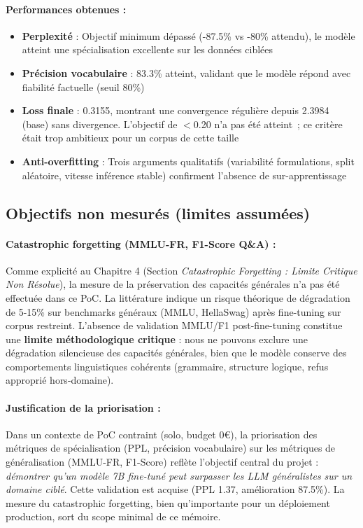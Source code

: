 \paragraph{Performances obtenues :}
\begin{itemize}
    \item \textbf{Perplexité} : Objectif minimum dépassé (-87.5\% vs -80\% attendu), le modèle atteint une spécialisation excellente sur les données ciblées
    \item \textbf{Précision vocabulaire} : 83.3\% atteint, validant que le modèle répond avec fiabilité factuelle (seuil 80\%)
    \item \textbf{Loss finale} : 0.3155, montrant une convergence régulière depuis 2.3984 (base) sans divergence. L'objectif de $<$0.20 n'a pas été atteint~; ce critère était trop ambitieux pour un corpus de cette taille
    \item \textbf{Anti-overfitting} : Trois arguments qualitatifs (variabilité formulations, split aléatoire, vitesse inférence stable) confirment l'absence de sur-apprentissage
\end{itemize}

\subsection{Objectifs non mesurés (limites assumées)}

\paragraph{Catastrophic forgetting (MMLU-FR, F1-Score Q\&A) :}
Comme explicité au Chapitre 4 (Section \textit{Catastrophic Forgetting : Limite Critique Non Résolue}), la mesure de la préservation des capacités générales n'a pas été effectuée dans ce PoC. La littérature \citep{kirkpatrick2017overcoming, french1999catastrophic} indique un risque théorique de dégradation de 5-15\% sur benchmarks généraux (MMLU, HellaSwag) après fine-tuning sur corpus restreint. L'absence de validation MMLU/F1 post-fine-tuning constitue une \textbf{limite méthodologique critique} : nous ne pouvons exclure une dégradation silencieuse des capacités générales, bien que le modèle conserve des comportements linguistiques cohérents (grammaire, structure logique, refus approprié hors-domaine).

\paragraph{Justification de la priorisation :}
Dans un contexte de PoC contraint (solo, budget 0€), la priorisation des métriques de spécialisation (PPL, précision vocabulaire) sur les métriques de généralisation (MMLU-FR, F1-Score) reflète l'objectif central du projet : \textit{démontrer qu'un modèle 7B fine-tuné peut surpasser les LLM généralistes sur un domaine ciblé}. Cette validation est acquise (PPL 1.37, amélioration 87.5\%). La mesure du catastrophic forgetting, bien qu'importante pour un déploiement production, sort du scope minimal de ce mémoire.

